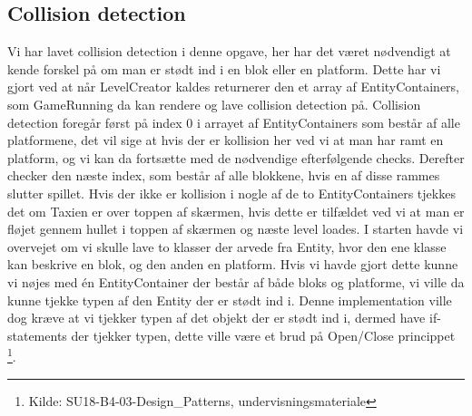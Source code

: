 \subsection{Collision detection}
Vi har lavet collision detection i denne opgave, her har det været nødvendigt at kende forskel på om man er stødt ind i en blok eller en platform. Dette har vi gjort ved at når LevelCreator kaldes returnerer den et array af EntityContainers, som GameRunning da kan rendere og lave collision detection på. Collision detection foregår først på index 0 i arrayet af EntityContainers som består af alle platformene, det vil sige at hvis der er kollision her ved vi at man har ramt en platform, og vi kan da fortsætte med de nødvendige efterfølgende checks. Derefter checker den næste index, som består af alle blokkene, hvis en af disse rammes slutter spillet. Hvis der ikke er kollision i nogle af de to EntityContainers tjekkes det om Taxien er over toppen af skærmen, hvis dette er tilfældet ved vi at man er fløjet gennem hullet i toppen af skærmen og næste level loades. I starten havde vi overvejet om vi skulle lave to klasser der arvede fra Entity, hvor den ene klasse kan beskrive en blok, og den anden en platform. Hvis vi havde gjort dette kunne vi nøjes med én EntityContainer der består af både bloks og platforme, vi ville da kunne tjekke typen af den Entity der er stødt ind i. Denne implementation ville dog kræve at vi tjekker typen af det objekt der er stødt ind i, dermed have if-statements der tjekker typen, dette ville være et brud på Open/Close princippet \footnote{Kilde: SU18-B4-03-Design\_Patterns, undervisningsmateriale}.

